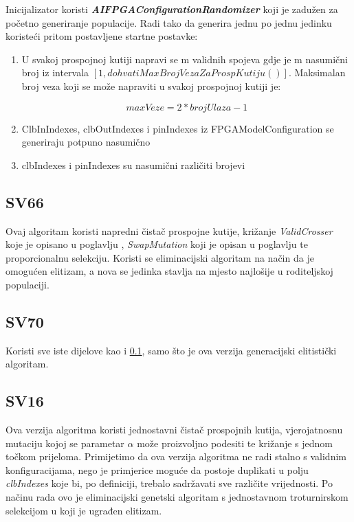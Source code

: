 \documentclass[times, utf8, zavrsni]{fer}
\begin{document}
Inicijalizator koristi \textbf{\emph{AIFPGAConfigurationRandomizer}} koji je zadužen za početno generiranje populacije. Radi tako da generira jednu po jednu jedinku koristeći pritom postavljene startne postavke:

\begin{enumerate}
	\item U svakoj prospojnoj kutiji napravi se m validnih spojeva gdje je m nasumični broj iz intervala $[1, dohvatiMaxBrojVezaZaProspKutiju()]$. Maksimalan broj veza koji se može napraviti u svakoj prospojnoj kutiji je:
	
	\begin{equation}
		maxVeze=2\ast brojUlaza -1
	\end{equation}

	\item ClbInIndexes, clbOutIndexes i pinIndexes iz FPGAModelConfiguration se generiraju potpuno nasumično
	\item clbIndexes i pinIndexes su nasumični različiti brojevi
\end{enumerate}


\subsection{SV66}
\label{SV66}

Ovaj algoritam koristi napredni čistač prospojne kutije, križanje \emph{ValidCrosser} koje je opisano u poglavlju \label{ValidCrosser}, \emph{SwapMutation} koji je opisan u poglavlju \label{EndMutation} te proporcionalnu selekciju. Koristi se eliminacijski algoritam na način da je omogućen elitizam, a nova se jedinka stavlja na mjesto najlošije u roditeljskoj populaciji. 

\subsection{SV70}
\label{SV70}

Koristi sve iste dijelove kao i \ref{SV66}, samo što je ova verzija generacijski elitistički algoritam.

\subsection{SV16}
\label{SV16}

Ova verzija algoritma koristi jednostavni čistač prospojnih kutija, vjerojatnosnu mutaciju kojoj se parametar $\alpha$ može proizvoljno podesiti te križanje s jednom točkom prijeloma. Primijetimo da ova verzija algoritma ne radi stalno s validnim konfiguracijama, nego je primjerice moguće da postoje duplikati u polju \emph{clbIndexes} koje bi, po definiciji, trebalo sadržavati sve različite vrijednosti. Po načinu rada ovo je eliminacijski genetski algoritam s jednostavnom troturnirskom selekcijom u koji je ugrađen elitizam.  
\end{document}
